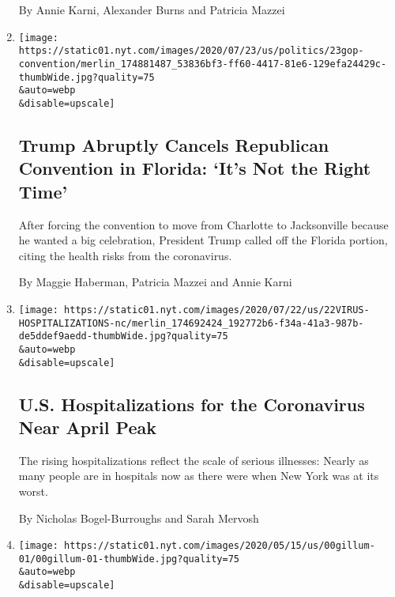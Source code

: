 \begin{enumerate}
  By Annie Karni, Alexander Burns and Patricia Mazzei
\item
  \href{/2020/07/23/us/politics/jacksonville-rnc.html}{}

  \texttt{[image: https://static01.nyt.com/images/2020/07/23/us/politics/23gop-convention/merlin\_174881487\_53836bf3-ff60-4417-81e6-129efa24429c-thumbWide.jpg?quality=75\\\&auto=webp\\\&disable=upscale]}

  \hypertarget{trump-abruptly-cancels-republican-convention-in-florida-its-not-the-right-time}{%
  \subsection{Trump Abruptly Cancels Republican Convention in Florida:
  `It's Not the Right
  Time'}\label{trump-abruptly-cancels-republican-convention-in-florida-its-not-the-right-time}}

  After forcing the convention to move from Charlotte to Jacksonville
  because he wanted a big celebration, President Trump called off the
  Florida portion, citing the health risks from the coronavirus.

  By Maggie Haberman, Patricia Mazzei and Annie Karni
\item
  \href{/2020/07/22/us/coronavirus-hospitalizations-near-peak.html}{}

  \texttt{[image: https://static01.nyt.com/images/2020/07/22/us/22VIRUS-HOSPITALIZATIONS-nc/merlin\_174692424\_192772b6-f34a-41a3-987b-de5ddef9aedd-thumbWide.jpg?quality=75\\\&auto=webp\\\&disable=upscale]}

  \hypertarget{us-hospitalizations-for-the-coronavirus-near-april-peak}{%
  \subsection{U.S. Hospitalizations for the Coronavirus Near April
  Peak}\label{us-hospitalizations-for-the-coronavirus-near-april-peak}}

  The rising hospitalizations reflect the scale of serious illnesses:
  Nearly as many people are in hospitals now as there were when New York
  was at its worst.

  By Nicholas Bogel-Burroughs and Sarah Mervosh
\item
  \href{/2020/07/21/us/andrew-gillum-incident.html}{}

  \texttt{[image: https://static01.nyt.com/images/2020/05/15/us/00gillum-01/00gillum-01-thumbWide.jpg?quality=75\\\&auto=webp\\\&disable=upscale]}


\end{enumerate}
